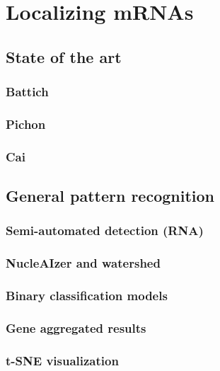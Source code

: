 
\graphicspath{{./figures/chapter_5/}}


\chapter{Localizing \ac{mRNA}s} \label{chap:chapter_5}
\minitoc
\newpage


\section{State of the art}


\subsection{Battich}

\subsection{Pichon}

\subsection{Cai}


\section{General pattern recognition}


\subsection{Semi-automated detection (\ac{RNA})}

\subsection{NucleAIzer and watershed}

\subsection{Binary classification models}

\subsection{Gene aggregated results}

\subsection{t-SNE visualization}


